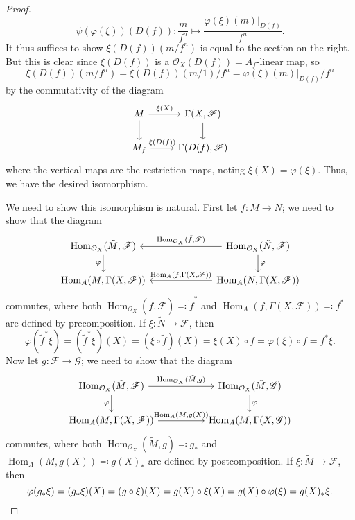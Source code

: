 \documentclass[10pt]{article}
\theoremstyle{definition}
\theoremstyle{remark}
\numberwithin{equation}{section}
\numberwithin{figure}{subsubsection}
\DeclareMathOperator{\Hom}{Hom}
\newcommand{\FF}{\mathscr{F}}
\newcommand{\GG}{\mathscr{G}}
\newcommand{\OO}{\mathcal{O}}
\begin{document}
\begin{proof}
  \begin{equation*}
    \psi(\varphi(\xi))(D(f)) \colon \frac{m}{f^n} \mapsto \frac{\varphi(\xi)(m)\vert_{D(f)}}{f^n}.
  \end{equation*}
  It thus suffices to show $\xi(D(f))(m/f^n)$ is equal to the section on the
  right. But this is clear since $\xi(D(f))$ is a $\OO_X(D(f)) = A_f$-linear
  map, so \[\xi(D(f))(m/f^n) = \xi(D(f))(m/1)/f^n =
  \varphi(\xi)(m)\vert_{D(f)}/f^n\] by the commutativity of the diagram
  \begin{equation*}
    \begin{tikzcd}
      M \rar{\xi(X)}\dar & \Gamma(X,\FF)\dar\\
      M_f \rar{\xi(D(f))} & \Gamma(D(f),\FF)
    \end{tikzcd}
  \end{equation*}
  where the vertical maps are the restriction maps, noting $\xi(X) = \varphi(\xi)$. Thus, we have the desired isomorphism.
  \par We need to show this isomorphism is natural. First let $f \colon M \to N$; we need to show that the diagram
  \begin{equation*}
    \begin{tikzcd}[column sep=15ex]
      \Hom_{\OO_X}(\tilde{M},\FF) \dar[swap]{\varphi} & \arrow{l}[swap]{\Hom_{\OO_X}(\tilde{f},\FF)} \Hom_{\OO_X}(\tilde{N},\FF) \dar{\varphi}\\
      \Hom_A(M,\Gamma(X,\FF)) & \arrow{l}[swap]{\Hom_A(f,\Gamma(X,\FF))} \Hom_A(N,\Gamma(X,\FF))
    \end{tikzcd}
  \end{equation*}
  commutes, where both $\Hom_{\OO_X}(\tilde{f},\FF) \eqqcolon \tilde{f}^*$ and $\Hom_A(f,\Gamma(X,\FF)) \eqqcolon f^*$ are defined by precomposition. If $\xi\colon \tilde{N} \to \FF$, then
  \begin{equation*}
    \varphi(\tilde{f}^*\xi) = (\tilde{f}^*\xi)(X) = (\xi\circ\tilde{f})(X) = \xi(X) \circ f = \varphi(\xi) \circ f = f^*\xi.
  \end{equation*}
  Now let $g\colon \FF \to \GG$; we need to show that the diagram
  \begin{equation*}
    \begin{tikzcd}[column sep=huge]
      \Hom_{\OO_X}(\tilde{M},\FF) \rar{\Hom_{\OO_X}(\tilde{M},g)}\dar[swap]{\varphi} & \Hom_{\OO_X}(\tilde{M},\GG)\dar{\varphi}\\
      \Hom_A(M,\Gamma(X,\FF)) \rar{\Hom_A(M,g(X))} & \Hom_A(M,\Gamma(X,\GG))
    \end{tikzcd}
  \end{equation*}
  commutes, where both $\Hom_{\OO_X}(\tilde{M},g) \eqqcolon g_*$ and $\Hom_A(M,g(X)) \eqqcolon g(X)_*$ are defined by postcomposition. If $\xi\colon \tilde{M} \to \FF$, then
  \begin{equation*}
    \varphi(g_*\xi) = (g_*\xi)(X) = (g \circ \xi)(X) = g(X) \circ \xi(X) = g(X) \circ \varphi(\xi) = g(X)_*\xi.\qedhere
  \end{equation*}
\end{proof}
\end{document}
